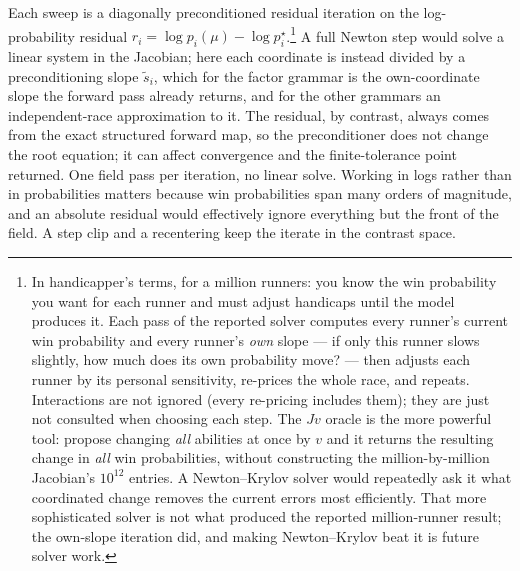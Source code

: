 \documentclass[11pt]{article}
\begin{document}
Each sweep is a diagonally preconditioned residual iteration on the
log-probability residual
$r_i=\log p_i(\mu)-\log p^{\star}_i$.\footnote{In handicapper's terms,
for a million runners: you know the win probability you want for each
runner and must adjust handicaps until the model produces it. Each pass
of the reported solver computes every runner's current win probability
and every runner's \emph{own} slope --- if only this runner slows
slightly, how much does its own probability move? --- then adjusts each
runner by its personal sensitivity, re-prices the whole race, and
repeats. Interactions are not ignored (every re-pricing includes them);
they are just not consulted when choosing each step. The $Jv$ oracle is
the more powerful tool: propose changing \emph{all} abilities at once by
$v$ and it returns the resulting change in \emph{all} win probabilities,
without constructing the million-by-million Jacobian's $10^{12}$
entries. A Newton--Krylov solver would repeatedly ask it what
coordinated change removes the current errors most efficiently. That
more sophisticated solver is not what produced the reported
million-runner result; the own-slope iteration did, and making
Newton--Krylov beat it is future solver work.} A full
Newton step would solve a linear system in the Jacobian; here each
coordinate is instead divided by a preconditioning slope $\tilde s_i$,
which for the factor grammar is the own-coordinate slope the forward pass
already returns, and for the other grammars an independent-race
approximation to it. The residual, by contrast, always comes from the
exact structured forward map, so the preconditioner does not change the
root equation; it can affect convergence and the finite-tolerance point
returned. One field pass per iteration, no linear solve. Working in
logs rather than in probabilities matters because win probabilities span
many orders of magnitude, and an absolute residual would effectively
ignore everything but the front of the field. A step clip and a
recentering keep the iterate in the contrast space.
\end{document}
